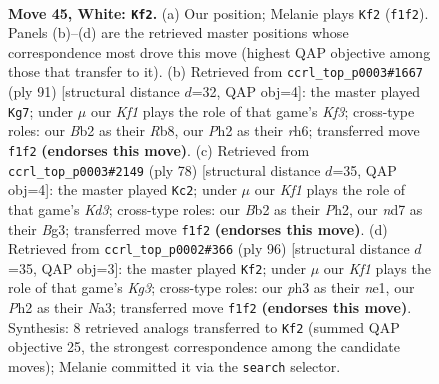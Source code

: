 \documentclass[11pt]{article}
\begin{document}
\clearpage

\begin{figure}[p]\centering
\begin{subfigure}{0.46\textwidth}\centering
\resizebox{\linewidth}{!}{%
\newchessgame
\chessboard[
  setfen={7k/3n4/4r3/8/p1p5/P1P3Pp/1BP4P/1R3K2 w - - 7 45},
  showmover=false,
  pgfstyle=straightmove, color=movearrow, markmove={f1-f2}
]}
\caption{}
\end{subfigure}\hfill
\begin{subfigure}{0.46\textwidth}\centering
\resizebox{\linewidth}{!}{%
\newchessgame
\chessboard[
  setfen={1r6/5p2/p2p1k1R/P1b5/1pP3P1/8/KP6/3B4 b - - 0 46},
  showmover=false,
  pgfstyle=straightmove, color=movearrow, markmove={f6-g7}
]}
\caption{}
\end{subfigure}
\\[4pt]
\begin{subfigure}{0.46\textwidth}\centering
\resizebox{\linewidth}{!}{%
\newchessgame
\chessboard[
  setfen={8/1R4b1/4p1k1/8/4P1p1/p2K2B1/5PPP/3r4 w - - 3 40},
  showmover=false,
  pgfstyle=straightmove, color=movearrow, markmove={d3-c2}
]}
\caption{}
\end{subfigure}\hfill
\begin{subfigure}{0.46\textwidth}\centering
\resizebox{\linewidth}{!}{%
\newchessgame
\chessboard[
  setfen={1r6/6kp/8/p1pP1P2/P1B5/NP4K1/8/4n3 w - - 2 49},
  showmover=false,
  pgfstyle=straightmove, color=movearrow, markmove={g3-f2}
]}
\caption{}
\end{subfigure}
\caption{\textbf{Move 45, White: \texttt{Kf2}.} (a) Our position; Melanie plays \texttt{Kf2} (\texttt{f1f2}). Panels (b)--(d) are the retrieved master positions whose correspondence most drove this move (highest QAP objective among those that transfer to it). (b) Retrieved from \texttt{ccrl\_top\_p0003\#1667} (ply 91) [structural distance $d$=32, QAP obj=4]: the master played \texttt{Kg7}; under $\mu$ our \emph{Kf1} plays the role of that game's \emph{Kf3}; cross-type roles: our \emph{B}b2 as their \emph{R}b8, our \emph{P}h2 as their \emph{r}h6; transferred move \texttt{f1f2} \textbf{(endorses this move)}. (c) Retrieved from \texttt{ccrl\_top\_p0003\#2149} (ply 78) [structural distance $d$=35, QAP obj=4]: the master played \texttt{Kc2}; under $\mu$ our \emph{Kf1} plays the role of that game's \emph{Kd3}; cross-type roles: our \emph{B}b2 as their \emph{P}h2, our \emph{n}d7 as their \emph{B}g3; transferred move \texttt{f1f2} \textbf{(endorses this move)}. (d) Retrieved from \texttt{ccrl\_top\_p0002\#366} (ply 96) [structural distance $d$=35, QAP obj=3]: the master played \texttt{Kf2}; under $\mu$ our \emph{Kf1} plays the role of that game's \emph{Kg3}; cross-type roles: our \emph{p}h3 as their \emph{n}e1, our \emph{P}h2 as their \emph{N}a3; transferred move \texttt{f1f2} \textbf{(endorses this move)}. Synthesis: 8 retrieved analogs transferred to \texttt{Kf2} (summed QAP objective 25, the strongest correspondence among the candidate moves); Melanie committed it via the \texttt{search} selector.}
\label{fig:thought-m88}
\end{figure}
\end{document}
